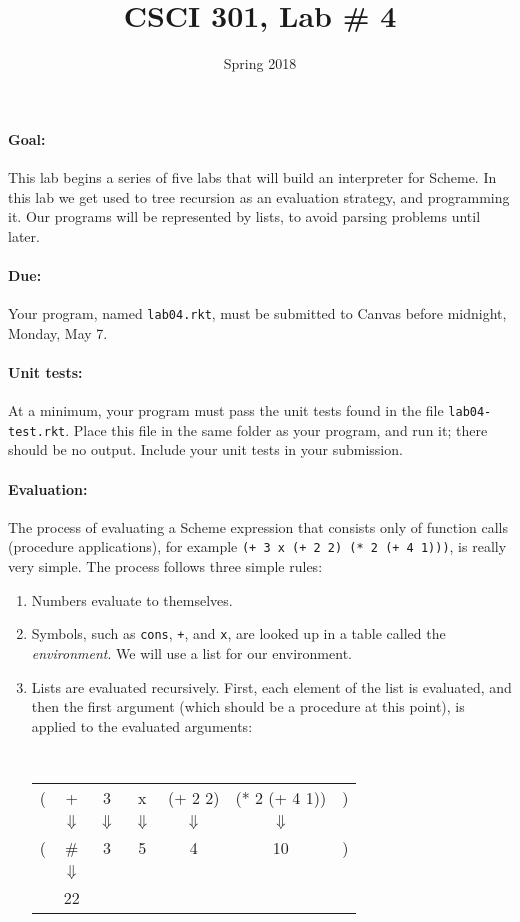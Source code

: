 \documentclass{article}
\title{CSCI 301, Lab \# 4}
\author{Spring 2018}
\date{}
\begin{document}
\maketitle


\paragraph{Goal:} This lab begins a series of five labs that will
build an interpreter for Scheme.  In this lab we get used to
tree recursion as an evaluation strategy, and programming it.
Our programs will be represented by lists, to avoid parsing problems
until later.

\paragraph{Due:} Your program, named {\tt lab04.rkt}, must be submitted to
Canvas before midnight, Monday, May 7.

\paragraph{Unit tests:}
At a minimum, your program must pass the unit tests found in the
file {\tt lab04-test.rkt}.  Place this file in the same folder
as your program, and run it;  there should be no output.  Include
your unit tests in your submission.

\paragraph{Evaluation:}  
The process of evaluating a Scheme expression that consists only of
function calls (procedure applications), for example
{\tt (+  3 x (+ 2 2) (* 2 (+ 4 1)))}, is really very simple.
The process follows three simple rules:
\begin{enumerate}
\item Numbers evaluate to themselves.
\item Symbols, such as {\tt cons}, {\tt +}, and {\tt x},
  are looked up in a table
  called the {\em environment}.  We will use a list for our
  environment. 
\item Lists are evaluated recursively.  First,
  each element of the list is evaluated, and then the first argument
  (which should be a procedure at this point), is applied to the
  evaluated arguments:

{\tt
  \begin{tabular}{ccccccc}
    ( & + & 3 & x & (+ 2 2) & (* 2 (+ 4 1)) & )\\
    & $\Downarrow$& $\Downarrow$& $\Downarrow$& $\Downarrow$& $\Downarrow$& \\
    ( & \#<procedure:+> & 3 & 5 & 4 & 10 & )\\
    &$\Downarrow$ \\
    &22\\
  \end{tabular}
}
\end{enumerate}
\end{document}
